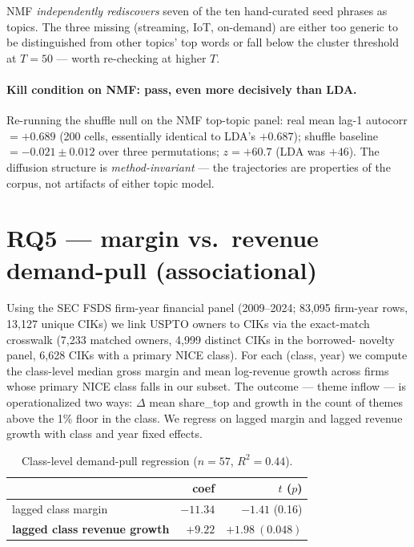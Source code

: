 \documentclass[11pt]{article}
\begin{document}
\noindent NMF \emph{independently rediscovers} seven of the ten hand-curated
seed phrases as topics. The three missing (streaming, IoT, on-demand) are
either too generic to be distinguished from other topics' top words or fall
below the cluster threshold at $T = 50$ --- worth re-checking at higher $T$.

\paragraph{Kill condition on NMF: pass, even more decisively than LDA.}
Re-running the shuffle null on the NMF top-topic panel: real mean lag-1
autocorr $= \mathbf{+0.689}$ (200 cells, essentially identical to LDA's
$+0.687$); shuffle baseline $= -0.021 \pm 0.012$ over three permutations;
\textbf{$z = +60.7$} (LDA was $+46$). The diffusion structure is
\emph{method-invariant} --- the trajectories are properties of the corpus, not
artifacts of either topic model.

\section{RQ5 --- margin vs.\ revenue demand-pull (associational)}
Using the SEC FSDS firm-year financial panel (2009--2024; 83{,}095 firm-year
rows, 13{,}127 unique CIKs) we link USPTO owners to CIKs via the exact-match
crosswalk (7{,}233 matched owners, 4{,}999 distinct CIKs in the borrowed-
novelty panel, 6{,}628 CIKs with a primary NICE class). For each (class,
year) we compute the class-level median gross margin and mean log-revenue
growth across firms whose primary NICE class falls in our subset. The
outcome --- theme inflow --- is operationalized two ways: $\Delta$ mean
share\_top and growth in the count of themes above the 1\% floor in the
class. We regress on lagged margin and lagged revenue growth with class and
year fixed effects.

\begin{table}[h]\centering\small
\caption{Class-level demand-pull regression ($n = 57$, $R^2 = 0.44$).}
\begin{tabular}{lrr}
\toprule
& coef & $t$ ($p$) \\
\midrule
lagged class margin             & $-11.34$ & $-1.41$ (0.16) \\
\textbf{lagged class revenue growth} & $\mathbf{+9.22}$ & $\mathbf{+1.98\ (0.048)}$ \\
\bottomrule
\end{tabular}
\end{table}
\end{document}
